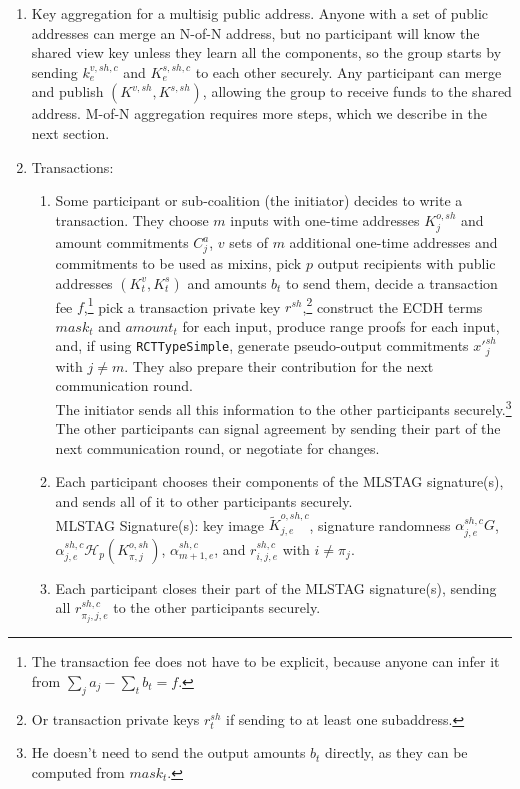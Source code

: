 \begin{enumerate}
    \item Key aggregation for a multisig public address. Anyone with a set of public addresses can merge an N-of-N address, but no participant will know the shared view key unless they learn all the components, so the group starts by sending $k^{v,sh,c}_e$ and $K^{s,sh,c}_e$ to each other securely. Any participant can merge and publish $(K^{v,sh},K^{s,sh})$, allowing the group to receive funds to the shared address. M-of-N aggregation requires more steps, which we describe in the next section.
    \item Transactions:
    \begin{enumerate}
        \item Some participant or sub-coalition (the initiator) decides to write a transaction. They choose $m$ inputs with one-time addresses $K^{o,sh}_{j}$ and amount commitments $C^a_j$, $v$ sets of $m$ additional one-time addresses and commitments to be used as mixins, pick $p$ output recipients with public addresses $(K^v_t,K^s_t)$ and amounts $b_t$ to send them, decide a transaction fee $f$,\footnote{The transaction fee does not have to be explicit, because anyone can infer it from $\sum_j a_j - \sum_t b_t = f$.} pick a transaction private key $r^{sh}$,\footnote{Or transaction private keys $r^{sh}_{t}$ if sending to at least one subaddress.} construct the ECDH terms $\mathit{mask}_t$ and $\mathit{amount}_t$ for each input, produce range proofs for each input, and, if using {\tt RCTTypeSimple}, generate pseudo-output commitments $x'^{sh}_{j}$ with $j \neq m$. They also prepare their contribution for the next communication round.\\
        
        The initiator sends all this information to the other participants securely.\footnote{He doesn't need to send the output amounts $b_t$ directly, as they can be computed from $\mathit{mask}_t$.} The other participants can signal agreement by sending their part of the next communication round, or negotiate for changes.
        \item Each participant chooses their components of the MLSTAG signature(s), and sends all of it to other participants securely.\\
        
        MLSTAG Signature(s): key image $\tilde{K}^{o,sh,c}_{j,e}$, signature randomness $\alpha^{sh,c}_{j,e} G$, $\alpha^{sh,c}_{j,e} \mathcal{H}_p(K^{o,sh}_{\pi,j})$, $\alpha^{sh,c}_{m+1,e}$, and $r^{sh,c}_{i,j,e}$ with $i \neq \pi_j$.
        \item Each participant closes their part of the MLSTAG signature(s), sending all $r^{sh,c}_{{\pi_j},j,e}$ to the other participants securely.
    \end{enumerate}
\end{enumerate}

